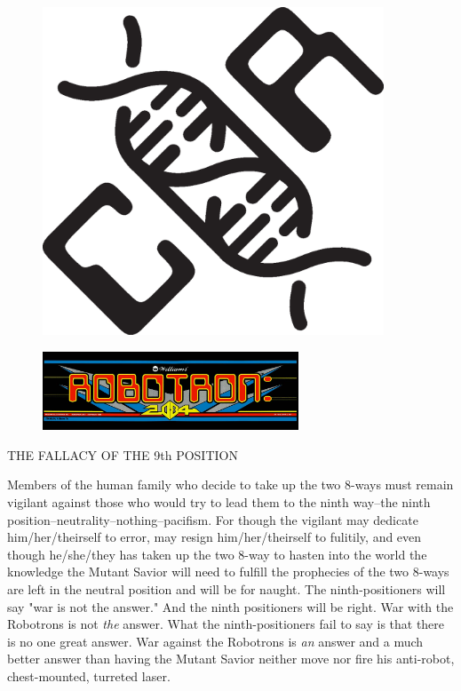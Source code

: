 \documentclass{amsbook}
\begin{document}
\begin{figure}
  \vspace{72pt}
  \includegraphics[width=4in]{cor-logo.eps}
\end{figure}

\clearpage

\begin{figure}
  \includegraphics[width=3in]{robotron-2084_marquee.jpg}
\end{figure}
{\ROBOFONTy THE FALLACY OF THE 9th POSITION}

Members of the human family who decide to take up the two 8-ways must
remain vigilant against those who would try to lead them to the ninth
way--the ninth position--neutrality--nothing--pacifism. For though the
vigilant may dedicate him/her/theirself to error, may resign
him/her/theirself to fulitily, and even though he/she/they has taken
up the two 8-way to hasten into the world the knowledge the Mutant
Savior will need to fulfill the prophecies of the two 8-ways are left
in the neutral position and will be for naught. The ninth-positioners
will say "war is not the answer." And the ninth positioners will be
right. War with the Robotrons is not {\em the} answer. What the
ninth-positioners fail to say is that there is no one great answer.
War against the Robotrons is {\em an} answer and a much better answer
than having the Mutant Savior neither move nor fire his anti-robot,
chest-mounted, turreted laser.
\end{document}

